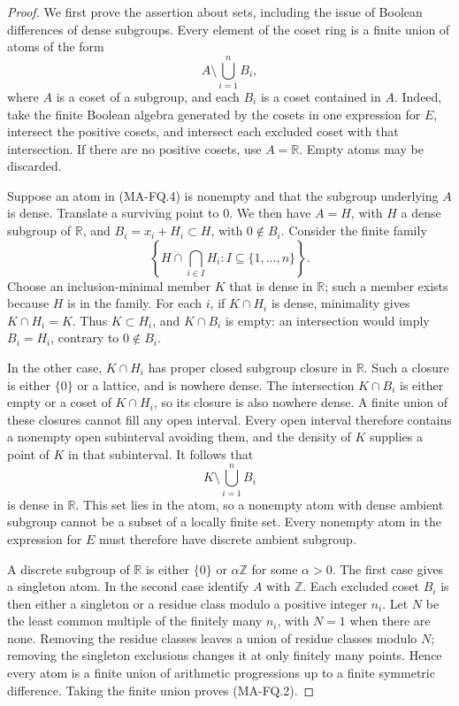 \begin{proof}
We first prove the assertion about sets, including the issue of
Boolean differences of dense subgroups. Every element of the
coset ring is a finite union of atoms of the form
\[
 A\setminus\bigcup_{i=1}^{n}B_i,
 \tag{MA-FQ.4}
\]
where $A$ is a coset of a subgroup, and each $B_i$ is a coset
contained in $A$. Indeed, take the finite Boolean algebra
generated by the cosets in one expression for $E$, intersect the
positive cosets, and intersect each excluded coset with that
intersection. If there are no positive cosets, use
$A=\mathbb R$. Empty atoms may be discarded.

Suppose an atom in (MA-FQ.4) is nonempty and that the subgroup
underlying $A$ is dense. Translate a surviving point to $0$.
We then have $A=H$, with $H$ a dense subgroup of $\mathbb R$,
and $B_i=x_i+H_i\subset H$, with $0\notin B_i$.
Consider the finite family
\[
 \left\{H\cap\bigcap_{i\in I}H_i:
                         I\subseteq\{1,\ldots,n\}\right\}.
\]
Choose an inclusion-minimal member $K$ that is dense in
$\mathbb R$; such a member exists because $H$ is in the family.
For each $i$, if $K\cap H_i$ is dense, minimality gives
$K\cap H_i=K$. Thus $K\subset H_i$, and $K\cap B_i$ is
empty: an intersection would imply $B_i=H_i$, contrary to
$0\notin B_i$.

In the other case, $K\cap H_i$ has proper closed subgroup
closure in $\mathbb R$. Such a closure is either $\{0\}$ or a
lattice, and is nowhere dense. The intersection $K\cap B_i$
is either empty or a coset of $K\cap H_i$, so its closure is
also nowhere dense. A finite union of these closures cannot
fill any open interval. Every open interval therefore contains
a nonempty open subinterval avoiding them, and the density of
$K$ supplies a point of $K$ in that subinterval. It follows that
\[
 K\setminus\bigcup_{i=1}^{n}B_i
\]
is dense in $\mathbb R$. This set lies in the atom, so a
nonempty atom with dense ambient subgroup cannot be a subset
of a locally finite set. Every nonempty atom in the expression
for $E$ must therefore have discrete ambient subgroup.

A discrete subgroup of $\mathbb R$ is either $\{0\}$ or
$\alpha\mathbb Z$ for some $\alpha>0$. The first case gives a
singleton atom. In the second case identify $A$ with
$\mathbb Z$. Each excluded coset $B_i$ is then either a
singleton or a residue class modulo a positive integer $n_i$.
Let $N$ be the least common multiple of the finitely many
$n_i$, with $N=1$ when there are none. Removing the residue
classes leaves a union of residue classes modulo $N$; removing
the singleton exclusions changes it at only finitely many
points. Hence every atom is a finite union of arithmetic
progressions up to a finite symmetric difference. Taking the
finite union proves (MA-FQ.2).


\end{proof}
